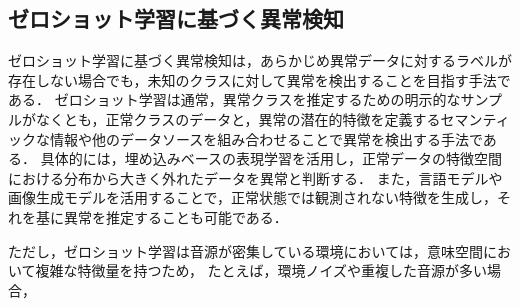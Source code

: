 \documentclass[../main]{subfiles}
\begin{document}
\subsection{ゼロショット学習に基づく異常検知}
ゼロショット学習に基づく異常検知は，あらかじめ異常データに対するラベルが存在しない場合でも，未知のクラスに対して異常を検出することを目指す手法である．
ゼロショット学習は通常，異常クラスを推定するための明示的なサンプルがなくとも，正常クラスのデータと，異常の潜在的特徴を定義するセマンティックな情報や他のデータソースを組み合わせることで異常を検出する手法である．
具体的には，埋め込みベースの表現学習を活用し，正常データの特徴空間における分布から大きく外れたデータを異常と判断する．
また，言語モデルや画像生成モデルを活用することで，正常状態では観測されない特徴を生成し，それを基に異常を推定することも可能である．

ただし，ゼロショット学習は音源が密集している環境においては，意味空間において複雑な特徴量を持つため，
たとえば，環境ノイズや重複した音源が多い場合，
\end{document}

